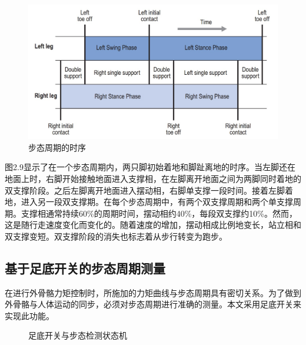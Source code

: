 \begin{figure}[htb]
    \includegraphics[width=15cm]{fig/f30.jpg}
    \caption{步态周期的时序\cite{p44}}
    \label{fig:mark}
\end{figure}

图2.9显示了在一个步态周期内，两只脚初始着地和脚趾离地的时序。当左脚还在地面上时，右脚开始接触地面进入支撑相，在左脚离开地面之间为两脚同时着地的双支撑阶段。之后左脚离开地面进入摆动相，右脚单支撑一段时间。接着左脚着地，进入另一段双支撑期。在每个步态周期中，有两个双支撑周期和两个单支撑周期。支撑相通常持续60\%的周期时间，摆动相约40\%，每段双支撑约10\%。然而，这是随行走速度变化而变化的。随着速度的增加，摆动相成比例地变长，站立相和双支撑变短。双支撑阶段的消失也标志着从步行转变为跑步。

\subsection{基于足底开关的步态周期测量}

在进行外骨骼力矩控制时，所施加的力矩曲线与步态周期具有密切关系。为了做到外骨骼与人体运动的同步，必须对步态周期进行准确的测量。本文采用足底开关来实现此功能。
\begin{figure}[!htb]
    \quad
    \caption{足底开关与步态检测状态机}
    \label{fig:subfigss}
\end{figure}

